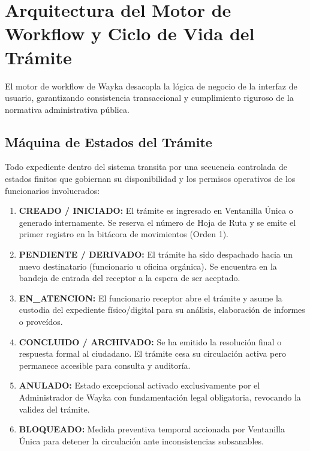 \documentclass[a4paper,12pt]{article}
\begin{document}
\section{Arquitectura del Motor de Workflow y Ciclo de Vida del Trámite}

El motor de workflow de Wayka desacopla la lógica de negocio de la interfaz de usuario, garantizando consistencia transaccional y cumplimiento riguroso de la normativa administrativa pública.

\subsection{Máquina de Estados del Trámite}
Todo expediente dentro del sistema transita por una secuencia controlada de estados finitos que gobiernan su disponibilidad y los permisos operativos de los funcionarios involucrados:

\begin{enumerate}[leftmargin=1.5em]
    \item \textbf{CREADO / INICIADO:} El trámite es ingresado en Ventanilla Única o generado internamente. Se reserva el número de Hoja de Ruta y se emite el primer registro en la bitácora de movimientos (Orden 1).
    \item \textbf{PENDIENTE / DERIVADO:} El trámite ha sido despachado hacia un nuevo destinatario (funcionario u oficina orgánica). Se encuentra en la bandeja de entrada del receptor a la espera de ser aceptado.
    \item \textbf{EN\_ATENCION:} El funcionario receptor abre el trámite y asume la custodia del expediente físico/digital para su análisis, elaboración de informes o proveídos.
    \item \textbf{CONCLUIDO / ARCHIVADO:} Se ha emitido la resolución final o respuesta formal al ciudadano. El trámite cesa su circulación activa pero permanece accesible para consulta y auditoría.
    \item \textbf{ANULADO:} Estado excepcional activado exclusivamente por el Administrador de Wayka con fundamentación legal obligatoria, revocando la validez del trámite.
    \item \textbf{BLOQUEADO:} Medida preventiva temporal accionada por Ventanilla Única para detener la circulación ante inconsistencias subsanables.
\end{enumerate}
\end{document}
